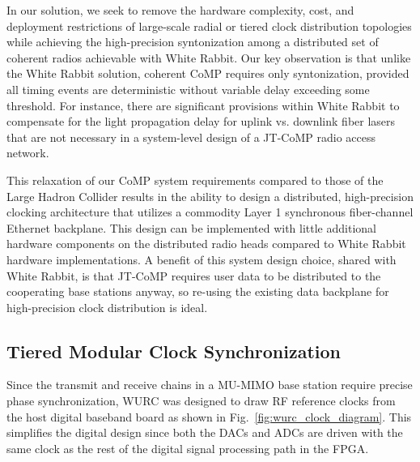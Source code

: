 In our solution, we seek to remove the hardware complexity, cost, and deployment restrictions of large-scale radial or tiered clock distribution topologies while achieving the high-precision syntonization among a distributed set of coherent radios achievable with White Rabbit.
	Our key observation is that unlike the White Rabbit solution, coherent \ac{CoMP} requires only syntonization, provided all timing events are deterministic without variable delay exceeding some threshold.
	For instance, there are significant provisions within White Rabbit to compensate for the light propagation delay for uplink vs. downlink fiber lasers that are not necessary in a system-level design of a \ac{JT}-\ac{CoMP} radio access network.
	
	This relaxation of our \ac{CoMP} system requirements compared to those of the Large Hadron Collider results in the ability to design a distributed, high-precision clocking architecture that utilizes a commodity Layer 1 synchronous fiber-channel Ethernet backplane.
	This design can be implemented with little additional hardware components on the distributed radio heads compared to White Rabbit hardware implementations.
	A benefit of this system design choice, shared with White Rabbit, is that \ac{JT}-\ac{CoMP} requires user data to be distributed to the cooperating base stations anyway, so re-using the existing data backplane for high-precision clock distribution is ideal.

\pagebreak

\subsection{Tiered Modular Clock Synchronization}
\label{sec_tiered_clocking}


Since the transmit and receive chains in a \ac{MU-MIMO} base station require precise phase synchronization, \ac{WURC} was designed to draw RF reference clocks from the host digital baseband board as shown in Fig.~\ref{fig:wurc_clock_diagram}.
This simplifies the digital design since both the \acp{DAC} and \acp{ADC} are driven with the same clock as the rest of the digital signal processing path in the \ac{FPGA}.


